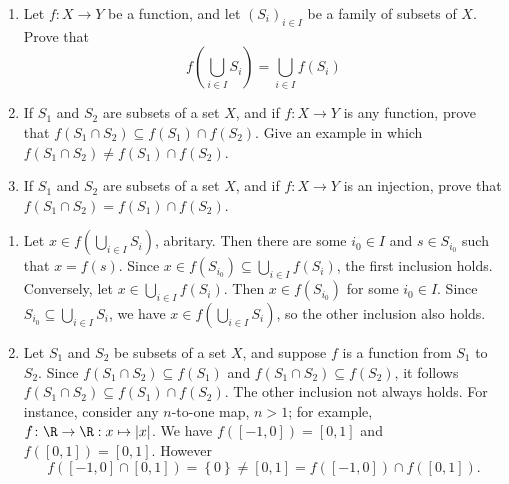 \begin{questions}
\begin{theproof}
\end{theproof}


\question
    \begin{enumerate}[label=(\alph*)]
        \item Let \(f: X \rightarrow Y\) be a function, and let \((S_i)_{i\in I}\) be a family of subsets of \(X\). Prove that
\[
f\left(\bigcup_{i \in I} S_i\right)=\bigcup_{i \in I} f\left(S_i\right)
\]

        \item If \(S_1\) and \(S_2\) are subsets of a set \(X\), and if \(f\colon X \rightarrow Y\) is any function, prove that \(f\left(S_1 \cap S_2\right) \subseteq f\left(S_1\right) \cap f\left(S_2\right)\). Give an example in which \(f\left(S_1 \cap S_2\right) \neq f\left(S_1\right) \cap f\left(S_2\right)\).
        
        \item If \(S_1\) and \(S_2\) are subsets of a set \(X\), and if \(f\colon X \rightarrow Y\) is an injection, prove that \(f\left(S_1 \cap S_2\right)=f\left(S_1\right) \cap f\left(S_2\right)\).
    \end{enumerate}

\begin{theproof}
\begin{enumerate}[label=(\alph*)]
    \item Let \(x\in f\left(\bigcup_{i \in I} S_i\right)\), abritary. Then there are some \(i_0\in I\) and  \(s\in S_{i_0}\) such that  \(x=f(s)\). 
    Since \(x\in f(S_{i_0}) \subseteq \bigcup_{i \in I} f\left(S_i\right)\), the first inclusion holds. 
    Conversely, let \(x\in \bigcup_{i \in I} f\left(S_i\right)\). 
    Then \(x\in f(S_{i_0})\) for some \(i_0\in I\).
    Since \(S_{i_0}\subseteq \bigcup_{i \in I} S_i\), we have \(x\in f\left(\bigcup_{i \in I} S_i\right)\), so the other inclusion also holds.

    \item Let \(S_1\) and \(S_2\) be subsets of a set \(X\), and suppose \(f\) is a function from \(S_1\) to \(S_2\).
    Since \(f\left(S_1 \cap S_2\right) \subseteq f\left(S_1\right) \) and \(f\left(S_1 \cap S_2\right) \subseteq f\left(S_2\right) \), it follows \(f\left(S_1 \cap S_2\right) \subseteq f\left(S_1\right) \cap f\left(S_2\right)\). 
    The other inclusion not always holds.
    For instance, consider any \(n\)-to-one map, \(n>1\); for example, \(f\colon \R\to \R: x\mapsto |x|\). We have \(f([-1,0]) = [0,1]\) and \(f([0,1]) = [0,1]\). However \[
        f([-1,0]\cap [0,1])  = \left\{ 0 \right\} \neq [0,1] = f([-1,0])\cap f([0,1]).
    \]


\end{enumerate}
\end{theproof}
\end{questions}
